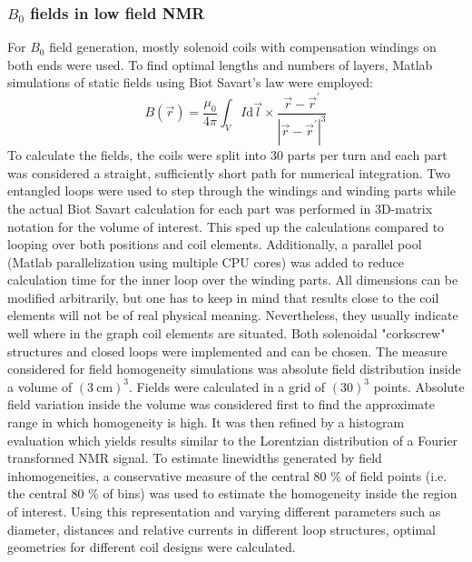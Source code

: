 \subsubsection{$B_0$ fields in low field NMR}\label{simulations:B0}
\label{sec:simulations:B0sim}
        For $B_0$ field generation, mostly solenoid coils with compensation windings on both ends were used. To find optimal lengths and numbers of layers, Matlab simulations of static fields using Biot Savart's law were employed:
        \begin{equation}
            B(\vec r) = \frac{\mu_0}{4\pi} \int_V I\mathrm{d} \vec l \times \frac{\vec r - \vec r^{'}}{\left|\vec r - \vec r^{'}\right|^3}
        \end{equation}
        To calculate the fields, the coils were split into 30 parts per turn and each part was considered a straight, sufficiently short path for numerical integration. Two entangled loops were used to step through the windings and winding parts while the actual Biot Savart calculation for each part was performed in  3D-matrix notation for the volume of interest. This sped up the calculations compared to looping over both positions and coil elements. Additionally, a parallel pool (Matlab parallelization using multiple CPU cores) was added to reduce calculation time for the inner loop over the winding parts.
        All dimensions can be modified arbitrarily, but one has to keep in mind that results close to the coil elements will not be of real physical meaning. Nevertheless, they usually indicate well where in the graph coil elements are situated.  Both solenoidal "corkscrew" structures and closed loops were implemented and can be chosen. The measure considered for field homogeneity simulations was absolute field distribution inside a volume of $(\SI{3}{\centi\meter})^3$. Fields were calculated in a grid of $(30)^3$ points. Absolute field variation inside the volume was considered first to find the approximate range in which homogeneity is high. It was then refined by a histogram evaluation which yields results similar to the Lorentzian distribution of a Fourier transformed NMR signal. To estimate linewidths generated by field inhomogeneities, a conservative measure of the central 80 \% of field points (i.e. the central 80 \% of bins) was used to estimate the homogeneity inside the region of interest.  Using this representation and varying different parameters such as diameter, distances and relative currents in different loop structures, optimal geometries for different coil designs were calculated.
